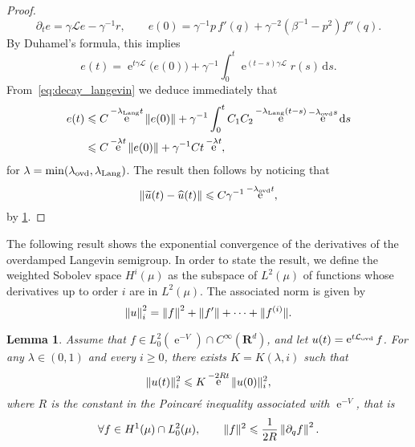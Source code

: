 \documentclass[11pt,a4paper]{article}
\DeclareMathOperator{\e}{e}
\newcommand{\real}{\mathbf R}
\renewcommand{\d}{\mathrm d}
\theoremstyle{plain}
\newtheorem{lemma}{Lemma}[section]
\numberwithin{equation}{section}
\renewcommand{\leq}{\leqslant}
\renewcommand{\geq}{\geqslant}
\begin{document}
\begin{proof}
    \[
        \partial_t e = \gamma \mathcal L e - \gamma^{-1} r, \qquad
        e(0) = \gamma^{-1} p \, f'(q) + \gamma^{-2} (\beta^{-1} - p^2) f''(q).
    \]
    By Duhamel's formula,
    this implies
    \[
        e(t) = \e^{t \gamma \mathcal L} \bigl( e(0) \bigr) + \gamma^{-1} \int_{0}^{t} \e^{(t- s) \gamma \mathcal L} r(s) \, \d s.
    \]
    From~\eqref{eq:decay_langevin} we deduce immediately that
    \begin{align*}
        e(t)
        &\leq C \e^{- \lambda_{\rm Lang} t} \norm{e(0)}
        + \gamma^{-1} \int_{0}^{t} C_1 C_2 \e^{- \lambda_{\rm Lang} (t-s)} \e^{-\lambda_{\rm ovd} s} \d s \\
        &\leq C \e^{- \lambda t} \norm{e(0)} + \gamma^{-1} C t \e^{- \lambda t},
    \end{align*}
    for $\lambda = \min(\lambda_{\rm ovd}, \lambda_{\rm Lang})$.
    The result then follows by noticing that
    \[
        \norm{\widetilde u(t) - \widehat u(t)} \leq C \gamma^{-1} \e^{- \lambda_{\rm ovd} t},
    \]
    by \cref{lemma:overdamped_langevin_decay_derivatives}.
\end{proof}

The following result shows the exponential convergence of the derivatives of the overdamped Langevin semigroup.
In order to state the result, we define the weighted Sobolev space $H^i(\mu)$ as the subspace of $L^2(\mu)$
of functions whose derivatives up to order $i$ are in $L^2(\mu)$.
The associated norm is given by
\[
    \norm{u}_i^2 = \norm{f}^2 + \norm*{f'} + \dotsb + \norm*{f^{(i)}}.
\]

\begin{lemma}
    \label{lemma:overdamped_langevin_decay_derivatives}
    Assume that $f \in L^2_0(\e^{-V}) \cap C^{\infty}(\real^d)$,
    and let $u(t) = \e^{t \mathcal L_{\rm ovd}} f$.
    For any $\lambda \in (0, 1)$ and every $i \geq 0$,
    there exists $K = K(\lambda, i)$ such that
    \[
        \norm*{u(t)}_i^2 \leq K \e^{- 2 R t} \norm*{u(0)}_i^2,
    \]
    where $R$ is the constant in the Poincaré inequality associated with $\e^{-V}$,
    that is
    \[
        \forall f \in H^1(\mu) \cap L^2_0(\mu), \qquad
        \norm*{f}^2 \leq \frac{1}{2R} \norm{\partial_q f}^2.
    \]
\end{lemma}
\end{document}
